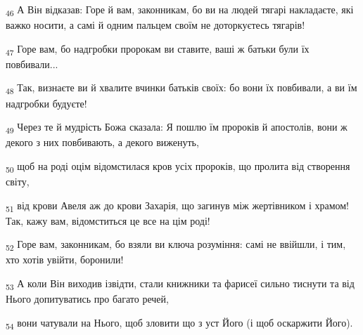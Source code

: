 \begin{tcolorbox}
\textsubscript{46} А Він відказав: Горе й вам, законникам, бо ви на людей тягарі накладаєте, які важко носити, а самі й одним пальцем своїм не доторкуєтесь тягарів!
\end{tcolorbox}
\begin{tcolorbox}
\textsubscript{47} Горе вам, бо надгробки пророкам ви ставите, ваші ж батьки були їх повбивали...
\end{tcolorbox}
\begin{tcolorbox}
\textsubscript{48} Так, визнаєте ви й хвалите вчинки батьків своїх: бо вони їх повбивали, а ви їм надгробки будуєте!
\end{tcolorbox}
\begin{tcolorbox}
\textsubscript{49} Через те й мудрість Божа сказала: Я пошлю їм пророків й апостолів, вони ж декого з них повбивають, а декого виженуть,
\end{tcolorbox}
\begin{tcolorbox}
\textsubscript{50} щоб на роді оцім відомстилася кров усіх пророків, що пролита від створення світу,
\end{tcolorbox}
\begin{tcolorbox}
\textsubscript{51} від крови Авеля аж до крови Захарія, що загинув між жертівником і храмом! Так, кажу вам, відомститься це все на цім роді!
\end{tcolorbox}
\begin{tcolorbox}
\textsubscript{52} Горе вам, законникам, бо взяли ви ключа розуміння: самі не ввійшли, і тим, хто хотів увійти, боронили!
\end{tcolorbox}
\begin{tcolorbox}
\textsubscript{53} А коли Він виходив ізвідти, стали книжники та фарисеї сильно тиснути та від Нього допитуватись про багато речей,
\end{tcolorbox}
\begin{tcolorbox}
\textsubscript{54} вони чатували на Нього, щоб зловити що з уст Його (і щоб оскаржити Його).
\end{tcolorbox}

